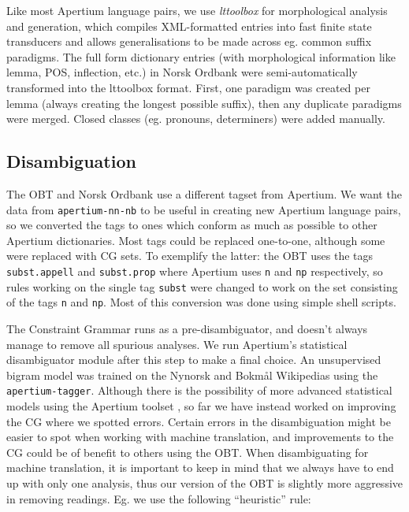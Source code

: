 \documentclass[11pt]{article}
\begin{document}
Like most Apertium language pairs, we use \emph{lttoolbox} for
morphological analysis and generation, which compiles XML-formatted
entries into fast finite state transducers and allows generalisations
to be made across eg. common suffix paradigms. The full form
dictionary entries (with morphological information like lemma, POS,
inflection, etc.) in Norsk Ordbank were semi-automatically transformed
into the lttoolbox format. First, one paradigm was created per lemma
(always creating the longest possible suffix), then any duplicate
paradigms were merged. Closed classes (eg. pronouns, determiners) were
added manually.

\subsection{Disambiguation}

The OBT and Norsk Ordbank use a different tagset from Apertium. We
want the data from {\tt apertium-nn-nb} to be useful in creating new
Apertium language pairs, so we converted the tags to ones which
conform as much as possible to other Apertium dictionaries. Most tags
could be replaced one-to-one, although some were replaced with CG
sets. To exemplify the latter: the OBT uses the tags {\tt
  subst.appell} and {\tt subst.prop} where Apertium uses {\tt n} and
{\tt np} respectively, so rules working on the single tag {\tt subst}
were changed to work on the set consisting of the tags {\tt n} and
{\tt np}. Most of this conversion was done using simple shell scripts.

The Constraint Grammar runs as a pre-disambiguator, and doesn't always
manage to remove all spurious analyses. We run Apertium's statistical
disambiguator module after this step to make a final choice. An
unsupervised bigram model was trained on the Nynorsk and Bokmål
Wikipedias using the {\tt apertium-tagger}. Although there is the
possibility of more advanced statistical models using the Apertium
toolset \citep[see~eg.~][]{sanchez2008utl,sheikh2009trigram}, so far
we have instead worked on improving the CG where we spotted
errors. Certain errors in the disambiguation might be easier to spot
when working with machine translation, and improvements to the CG
could be of benefit to others using the OBT. When disambiguating for
machine translation, it is important to keep in mind that we always
have to end up with only one analysis, thus our version of the OBT is
slightly more aggressive in removing readings. Eg. we use the
following ``heuristic'' rule:
\end{document}
